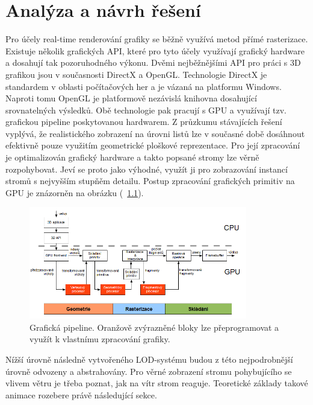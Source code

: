 \chapter{Analýza a návrh řešení}
\label{chap:analyza}

Pro účely real-time renderování grafiky se běžně využívá metod přímé rasterizace. Existuje několik grafických API, které pro tyto účely využívají grafický hardware a dosahují tak pozoruhodného výkonu. Dvěmi nejběžnějšími API pro práci s 3D grafikou jsou v současnosti DirectX a OpenGL. Technologie DirectX je standardem v oblasti počítačových her a je vázaná na platformu Windows. Naproti tomu OpenGL je platformově nezávislá knihovna dosahující srovnatelných výsledků. Obě technologie pak pracují s GPU a využívají tzv. grafickou pipeline poskytovanou hardwarem.
Z průzkumu stávajících řešení vyplývá, že realistického zobrazení na úrovni listů lze v současné době dosáhnout efektivně pouze využitím geometrické ploškové reprezentace. Pro její zpracování je optimalizován grafický hardware a takto popsané stromy lze věrně rozpohybovat. Jeví se proto jako výhodné, využít ji pro zobrazování instancí stromů s nejvyšším stupňěm detailu. Postup zpracování grafických primitiv na GPU je znázorněn na obrázku (~\ref{fig:gpupipeline}).

\begin{figure}[!hbt]
\begin{center}
\includegraphics[width=0.85\textwidth]{./figures/GPUpipeline.png}
\end{center}
\caption{Grafická pipeline. Oranžově zvýrazněné bloky lze přeprogramovat a využít k vlastnímu zpracování grafiky.
\label{fig:gpupipeline}
}
\end{figure}


Nížší úrovně následně vytvořeného LOD-systému budou z této nejpodrobnější úrovně odvozeny a abstrahovány. Pro věrné zobrazení stromu pohybujícího se vlivem větru je třeba poznat, jak na vítr strom reaguje. Teoretické základy takové animace rozebere právě následující sekce.



